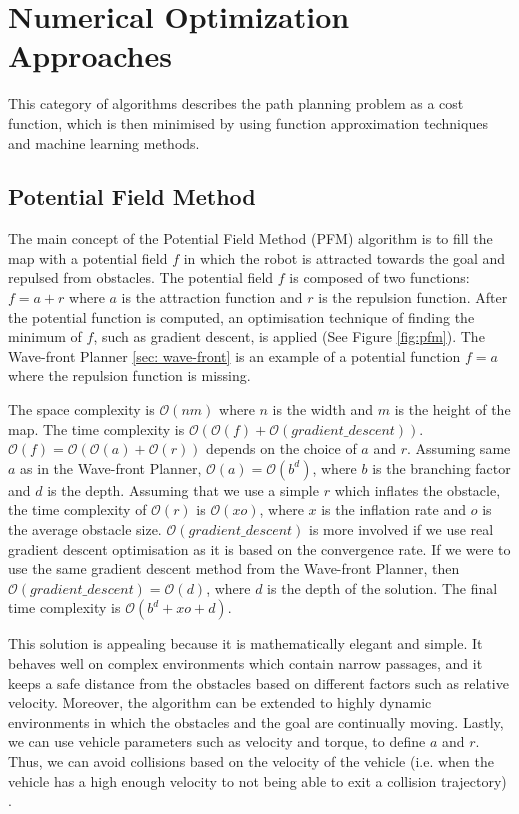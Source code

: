 \section{Numerical Optimization Approaches} \label{D. Numerical optimization approaches}
This category of algorithms describes the path planning problem as a cost function, which is then minimised by using function approximation techniques and machine learning methods.

\subsection{Potential Field Method}
The main concept of the Potential Field Method (PFM) \cite{gonzalez2016review, ge2002dynamic, barraquand1992numerical} algorithm is to fill the map with a potential field $f$ in which the robot is attracted towards the goal and repulsed from obstacles. The potential field $f$ is composed of two functions: $f = a + r$ where $a$ is the attraction function and $r$ is the repulsion function. After the potential function is computed, an optimisation technique of finding the minimum of $f$, such as gradient descent, is applied (See Figure \ref{fig:pfm}). The Wave-front Planner \ref{sec: wave-front} is an example of a potential function $f=a$ where the repulsion function is missing.

The space complexity is $\mathcal{O}(nm)$ where $n$ is the width and $m$ is the height of the map. The time complexity is $\mathcal{O}(\mathcal{O}(f) + \mathcal{O}(gradient\_descent))$. $\mathcal{O}(f) = \mathcal{O}(\mathcal{O}(a) + \mathcal{O}(r))$ depends on the choice of $a$ and $r$. Assuming same $a$ as in the Wave-front Planner, $\mathcal{O}(a) = \mathcal{O}(b^d)$, where $b$ is the branching factor and $d$ is the depth. Assuming that we use a simple $r$ which inflates the obstacle, the time complexity of $\mathcal{O}(r)$ is $\mathcal{O}(xo)$, where $x$ is the inflation rate and $o$ is the average obstacle size. $\mathcal{O}(gradient\_descent)$ is more involved if we use real gradient descent optimisation as it is based on the convergence rate. If we were to use the same gradient descent method from the Wave-front Planner, then $\mathcal{O}(gradient\_descent) = \mathcal{O}(d)$, where $d$ is the depth of the solution. The final time complexity is $\mathcal{O}(b^d + xo + d)$.

This solution is appealing because it is mathematically elegant and simple. It behaves well on complex environments which contain narrow passages, and it keeps a safe distance from the obstacles based on different factors such as relative velocity. Moreover, the algorithm can be extended to highly dynamic environments in which the obstacles and the goal are continually moving. Lastly, we can use vehicle parameters such as velocity and torque, to define $a$ and $r$. Thus, we can avoid collisions based on the velocity of the vehicle (i.e. when the vehicle has a high enough velocity to not being able to exit a collision trajectory) \cite{ge2002dynamic}.

